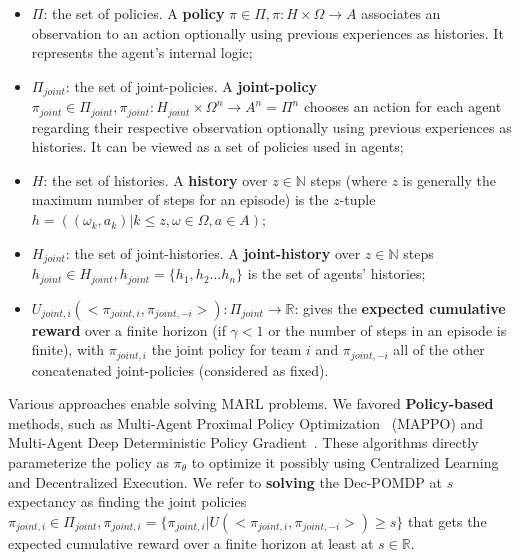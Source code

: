 \documentclass[sigconf,anonymous]{aamas}
\begin{document}
\begin{itemize}

  \item $\Pi$: the set of policies. A \textbf{policy} $\pi \in \Pi, \pi: H \times \Omega \rightarrow A$ associates an observation to an action optionally using previous experiences as histories. It represents the agent's internal logic;
  \item $\Pi_{joint}$: the set of joint-policies. A \textbf{joint-policy} $\pi_{joint} \in \Pi_{joint}, \pi_{joint}: H_{joint} \times \Omega^n \rightarrow A^n = \Pi^n$ chooses an action for each agent regarding their respective observation optionally using previous experiences as histories. It can be viewed as a set of policies used in agents;
  \item $H$: the set of histories. A \textbf{history} over $z \in \mathbb{N}$ steps (where $z$ is generally the maximum number of steps for an episode) is the $z$-tuple $h = ((\omega_{k}, a_{k}) | k \leq z, \omega \in \Omega, a \in A)$;
  \item $H_{joint}$: the set of joint-histories. A \textbf{joint-history} over $z \in \mathbb{N}$ steps $h_{joint} \in H_{joint}, h_{joint} = \{h_1,h_2 \dots h_n\}$ is the set of agents' histories;
  \item $U_{joint,i}(<\pi_{joint,i}, \pi_{joint,-i}>): \Pi_{joint} \rightarrow \mathbb{R}$: gives the \textbf{expected cumulative reward} over a finite horizon (if $\gamma < 1$ or the number of steps in an episode is finite), with $\pi_{joint,i}$ the joint policy for team $i$ and $\pi_{joint,-i}$ all of the other concatenated joint-policies (considered as fixed).
\end{itemize}

Various approaches enable solving MARL problems. We favored \textbf{Policy-based} methods, such as Multi-Agent Proximal Policy Optimization~\cite{yu2022surprising} (MAPPO) and Multi-Agent Deep Deterministic Policy Gradient~\cite{Lowe2017}. These algorithms directly parameterize the policy as $\pi_\theta$ to optimize it possibly using Centralized Learning and Decentralized Execution.
We refer to \textbf{solving} the Dec-POMDP at $s$ expectancy as finding the joint policies $\pi_{joint,i} \in \Pi_{joint}, \pi_{joint,i} = \{\pi_{joint,i} | U(<\pi_{joint,i},\pi_{joint,-i}>) \geq s\}$ that gets the expected cumulative reward over a finite horizon at least at $s \in \mathbb{R}$.
\end{document}
